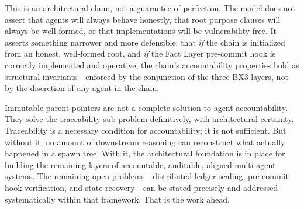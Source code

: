 This is an architectural claim, not a guarantee of perfection. The model does not assert that agents will always behave honestly, that root purpose clauses will always be well-formed, or that implementations will be vulnerability-free. It asserts something narrower and more defensible: that \emph{if} the chain is initialized from an honest, well-formed root, and \emph{if} the Fact Layer pre-commit hook is correctly implemented and operative, the chain's accountability properties hold as structural invariants---enforced by the conjunction of the three BX3 layers, not by the discretion of any agent in the chain.

Immutable parent pointers are not a complete solution to agent accountability. They solve the traceability sub-problem definitively, with architectural certainty. Traceability is a necessary condition for accountability; it is not sufficient. But without it, no amount of downstream reasoning can reconstruct what actually happened in a spawn tree. With it, the architectural foundation is in place for building the remaining layers of accountable, auditable, aligned multi-agent systems. The remaining open problems---distributed ledger scaling, pre-commit hook verification, and state recovery---can be stated precisely and addressed systematically within that framework. That is the work ahead.
